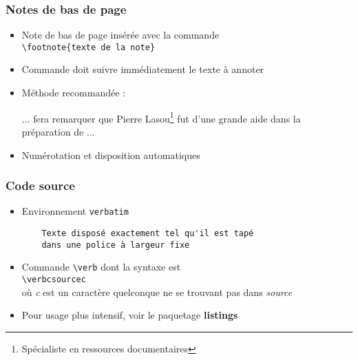 
\begin{frame}[fragile]

	\frametitle{Notes de bas de page}
	
	\begin{itemize}
		\item Note de bas de page insérée avec la commande \\
			\lstinline|\footnote{texte de la note}|
			
		\item Commande doit suivre immédiatement le texte à annoter
		
		\item Méthode recommandée : 
		\begin{codesource}
	... fera remarquer que Pierre Lasou\footnote{%
	Spécialiste en ressources documentaires} %
	fut d'une grande aide dans la préparation de ...
		\end{codesource}
				
		\item Numérotation et disposition automatiques
	\end{itemize}
\end{frame}


\begin{frame}[fragile]

	\frametitle{Code source}
	
	\begin{itemize}
		\item Environnement \texttt{verbatim}
		\begin{codesource}
	\begin{verbatim}
	Texte disposé exactement tel qu'il est tapé
	dans une police à largeur fixe
	\end{verbatim}
		\end{codesource}
	
		\item Commande \texttt{\textbackslash verb} dont la syntaxe est \\
			\lstinline|\verbcsourcec| \\
			où \textit{c} est un caractère quelconque ne se trouvant pas dans \textit{source}
			
		\item Pour usage plus intensif, voir le paquetage \textbf{listings}
	\end{itemize}
\end{frame}